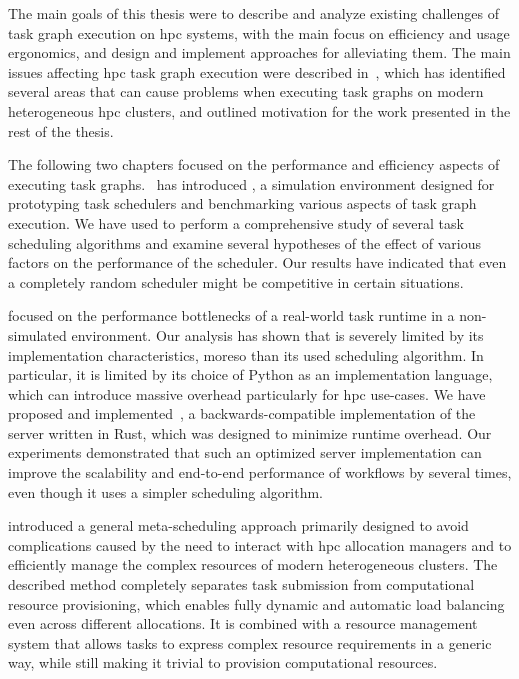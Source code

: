 The main goals of this thesis were to describe and analyze existing challenges of task graph
execution on \gls{hpc} systems, with the main focus on efficiency and usage
ergonomics, and design and implement approaches for alleviating them. The main issues affecting
\gls{hpc} task graph execution were described in~, which
has identified several areas that can cause problems when executing task graphs on modern
heterogeneous \gls{hpc} clusters, and outlined motivation for the work presented
in the rest of the thesis.

The following two chapters focused on the performance and efficiency aspects of executing task
graphs.~ has introduced \estee{}, a simulation
environment designed for prototyping task schedulers and benchmarking various aspects of task graph
execution. We have used \estee{} to perform a comprehensive study of several task
scheduling algorithms and examine several hypotheses of the effect of various factors on the
performance of the scheduler. Our results have indicated that even a completely random scheduler
might be competitive in certain situations.


 focused on the performance bottlenecks of a real-world task runtime
\dask{} in a non-simulated environment. Our analysis
has shown that \dask{} is severely limited by its implementation
characteristics, moreso than its used scheduling algorithm. In particular, it is limited by its
choice of Python as an implementation language, which can introduce massive overhead particularly
for \gls{hpc} use-cases. We have proposed and
implemented~\rsds{}, a backwards-compatible implementation of the
\dask{} server written in Rust, which was designed to minimize runtime overhead.
Our experiments demonstrated that such an optimized server implementation can improve the
scalability and end-to-end performance of \dask{} workflows by several times,
even though it uses a simpler scheduling algorithm.

 introduced a
general meta-scheduling approach primarily designed to avoid complications caused by the need to
interact with \gls{hpc} allocation managers and to efficiently manage the complex
resources of modern heterogeneous clusters. The described method completely separates task
submission from computational resource provisioning, which enables fully dynamic and automatic load
balancing even across different allocations. It is combined with a resource management system that
allows tasks to express complex resource requirements in a generic way, while still making it
trivial to provision computational resources.

